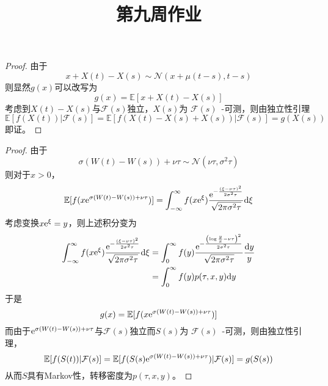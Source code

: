 \documentclass[cn]{homework}
\title{第九周作业}
\newcommand{\E}{\mathbb E}
\begin{document}
    \maketitle

    \problem[习题3.6]
    \begin{subproblem}
        \item
        \begin{proof}
            由于
            \[x+X(t)-X(s)\sim\mathcal N(x+\mu(t-s),t-s)\]
            则显然$g(x)$可以改写为
            \[g(x)=\E[x+X(t)-X(s)]\]
            考虑到$X(t)-X(s)$与$\mathcal F(s)$独立，$X(s)$为
            $\mathcal F(s)$~-可测，则由独立性引理
            \[\E[f(X(t))|\mathcal F(s)]=\E[f(X(t)-X(s)+X(s))|\mathcal F(s)]
            =g(X(s))\]
            即证。
        \end{proof}

        \item
        \begin{proof}
            \newcommand{\npdf}[2]{\frac{\e^{-\frac{{#1}^2}{2 #2}}}{\sqrt{2\pi #2}}}
            由于
            \[\sigma(W(t)-W(s))+\nu\tau\sim\mathcal N(\nu\tau,\sigma^2\tau)\]
            则对于$x>0$，
            \[\E[f(x\e^{\sigma(W(t)-W(s))+\nu\tau})]
            =\int_{-\infty}^\infty
            f(x\e^\xi)
            \npdf{(\xi-\nu\tau)}{\sigma^2\tau}
            \diff\xi\]
            考虑变换$x\mathrm e^\xi=y$，则上述积分变为
            \[\begin{aligned}
            \int_{-\infty}^\infty
            f(x\e^\xi)
            \npdf{(\xi-\nu\tau)}{\sigma^2\tau}
            \diff\xi
            &=
            \int_{0}^\infty
            f(y)\npdf{\left(\log\frac{y}{x}-\nu\tau\right)}{\sigma^2\tau}
            \frac{\diff y}y\\
            &=\int_0^\infty f(y)p(\tau,x,y)\diff y
            \end{aligned}\]
            于是
            \[g(x)=\E[f(x\e^{\sigma(W(t)-W(s))+\nu\tau})]\]
            而由于$\mathrm e^{\sigma(W(t)-W(s))+\nu\tau}$与$\mathcal F(s)$独立而$S(s)$为
            $\mathcal F(s)$~-可测，则由独立性引理，
            \[\E[f(S(t))|\mathcal F(s)]=\E[f(S(s)\e^{\sigma(W(t)-W(s))+\nu\tau})|\mathcal F(s)]
            =g(S(s))\]
            从而$S$具有Markov性，转移密度为$p(\tau,x,y)$。
        \end{proof}
    \end{subproblem}
\end{document}
